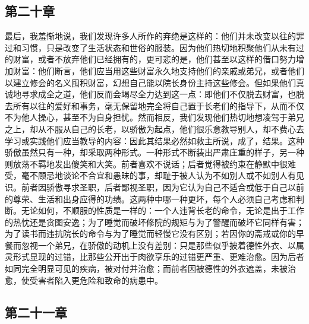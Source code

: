 
\subsection{第二十章}

\par

最后，我羞惭地说，我们发现许多人所作的弃绝是这样的：他们并未改变以往的罪过和习惯，只是改变了生活状态和世俗的服装。因为他们热切地积聚他们从未有过的财富，或者不放弃他们已经拥有的，更可悲的是，他们甚至以这样的借口努力增加财富：他们断言，他们应当用这些财富永久地支持他们的亲戚或弟兄，或者他们以建立修会的名义囤积财富，幻想自己能以院长身份主持这些修会。但如果他们真诚地寻求成全之道，他们反而会竭尽全力达到这一点：即他们不仅脱去财富，也脱去所有以往的爱好和事务，毫无保留地完全将自己置于长老们的指导下，从而不仅不为他人操心，甚至不为自身担忧。然而相反，我们发现他们热切地想凌驾于弟兄之上，却从不服从自己的长老，以骄傲为起点，他们很乐意教导别人，却不费心去学习或实践他们应当教导的内容：因此其结果必然如救主所说，成了，结果。这种骄傲虽然只有一种，却采取两种形式。一种形式不断装出严肃庄重的样子，另一种则放荡不羁地发出傻笑和大笑。前者喜欢不说话；后者觉得被约束在静默中很难受，毫不顾忌地谈论不合宜和愚昧的事，却耻于被人认为不如别人或不如别人有见识。前者因骄傲寻求圣职，后者鄙视圣职，因为它认为自己不适合或低于自己以前的尊荣、生活和出身应得的功绩。这两种中哪一种更坏，每个人必须自己考虑和判断。无论如何，不顺服的性质是一样的：一个人违背长老的命令，无论是出于工作的热忱还是贪图安逸；为了睡觉而破坏修院的规矩与为了警醒而破坏它同样有害；为了读书而违抗院长的命令与为了睡觉而轻慢它没有区别；若因你的斋戒或你的早餐而忽视一个弟兄，在骄傲的动机上没有差别：只是那些似乎披着德性外衣、以属灵形式显现的过错，比那些公开出于肉欲享乐的过错更严重、更难治愈。因为后者如同完全明显可见的疾病，被对付并治愈；而前者因被德性的外衣遮盖，未被治愈，使受害者陷入更危险和致命的病患中。\par


\subsection{第二十一章}

\par

